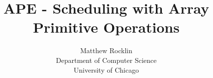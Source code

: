 

\title{APE - Scheduling with Array Primitive Operations}
\author{
Matthew Rocklin \\
Department of Computer Science\\
University of Chicago
}

\date{}
%

\maketitle









